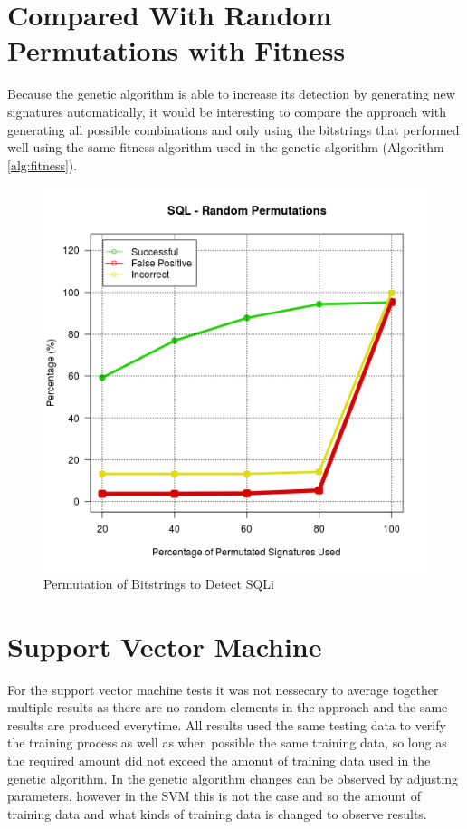 \section{Compared With Random Permutations with Fitness}

Because the genetic algorithm is able to increase its detection by generating new signatures automatically, it would be interesting to compare the approach with generating all possible combinations and only using the bitstrings that performed well using the same fitness algorithm used in the genetic algorithm (Algorithm \ref{alg:fitness}).

\begin{figure}
	\label{fig:resRand}
	\includegraphics[width=450px]{./assets/results/rand/Results_SQL.png}
	\caption{Permutation of Bitstrings to Detect SQLi}
\end{figure}

\section{Support Vector Machine}

For the support vector machine tests it was not nessecary to average together multiple results as there are no random elements in the approach and the same results are produced everytime.  All results used the same testing data to verify the training process as well as when possible the same training data, so long as the required amount did not exceed the amonut of training data used in the genetic algorithm.  In the genetic algorithm changes can be observed by adjusting parameters, however in the SVM this is not the case and so the amount of training data and what kinds of training data is changed to observe results.

